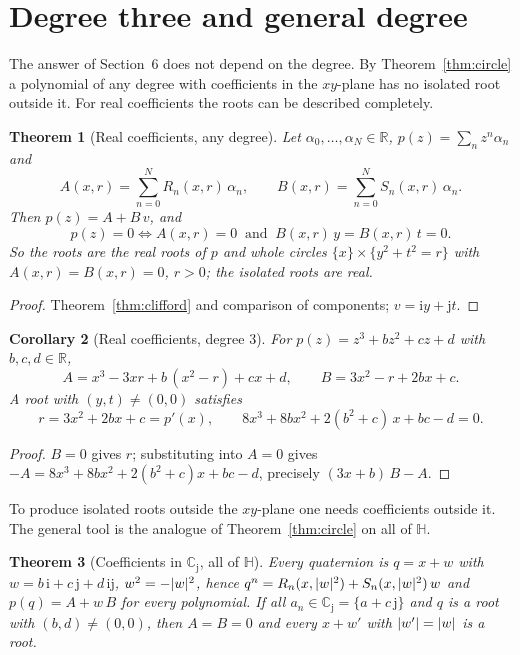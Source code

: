 \documentclass[11pt,a4paper]{article}
\newcommand{\ii}{\mathrm{i}}
\newcommand{\jj}{\mathrm{j}}
\newcommand{\R}{\mathbb{R}}
\newcommand{\HH}{\mathbb{H}}
\DeclarePairedDelimiter{\abs}{\lvert}{\rvert}
\newtheorem{theorem}{Theorem}
\newtheorem{corollary}[theorem]{Corollary}
\theoremstyle{remark}
\begin{document}
\section{Degree three and general degree}

The answer of Section~6 does not depend on the degree. By Theorem~\ref{thm:circle} a polynomial
of any degree with coefficients in the $xy$-plane has no isolated root outside it. For real
coefficients the roots can be described completely.

\begin{theorem}[Real coefficients, any degree]\label{thm:realpoly}
Let $\alpha_0,\dots,\alpha_N\in\R$, $p(z)=\sum_nz^n\alpha_n$ and
\[
  A(x,r)=\sum_{n=0}^{N}R_n(x,r)\,\alpha_n,\qquad B(x,r)=\sum_{n=0}^{N}S_n(x,r)\,\alpha_n .
\]
Then $p(z)=A+B\,v$, and
\[
  p(z)=0\iff A(x,r)=0\ \text{ and }\ B(x,r)\,y=B(x,r)\,t=0 .
\]
So the roots are the real roots of $p$ and whole circles $\{x\}\times\{y^2+t^2=r\}$ with
$A(x,r)=B(x,r)=0$, $r>0$; the isolated roots are real.
\end{theorem}

\begin{proof}
Theorem~\ref{thm:clifford} and comparison of components; $v=\ii y+\jj t$.
\end{proof}

\begin{corollary}[Real coefficients, degree $3$]\label{cor:realcubic}
For $p(z)=z^3+bz^2+cz+d$ with $b,c,d\in\R$,
\[
  A=x^3-3xr+b\,(x^2-r)+cx+d,\qquad B=3x^2-r+2bx+c .
\]
A root with $(y,t)\ne(0,0)$ satisfies
\[
  \boxed{\;r=3x^2+2bx+c=p'(x),\qquad 8x^3+8bx^2+2(b^2+c)\,x+bc-d=0.\;}
\]
\end{corollary}

\begin{proof}
$B=0$ gives $r$; substituting into $A=0$ gives $-A=8x^3+8bx^2+2(b^2+c)x+bc-d$, precisely
$(3x+b)\,B-A$.
\end{proof}

To produce isolated roots outside the $xy$-plane one needs coefficients outside it. The general
tool is the analogue of Theorem~\ref{thm:circle} on all of $\HH$.

\begin{theorem}[Coefficients in $\mathbb{C}_{\jj}$, all of $\HH$]\label{thm:sphere}
Every quaternion is $q=x+w$ with $w=b\,\ii+c\,\jj+d\,\ii\jj$, $w^2=-\abs{w}^2$, hence
$q^n=R_n(x,\abs{w}^2)+S_n(x,\abs{w}^2)\,w$ and $p(q)=A+w\,B$ for every polynomial. If all
$a_n\in\mathbb{C}_{\jj}=\{a+c\,\jj\}$ and $q$ is a root with $(b,d)\ne(0,0)$, then $A=B=0$ and
every $x+w'$ with $\abs{w'}=\abs{w}$ is a root.
\end{theorem}
\end{document}
